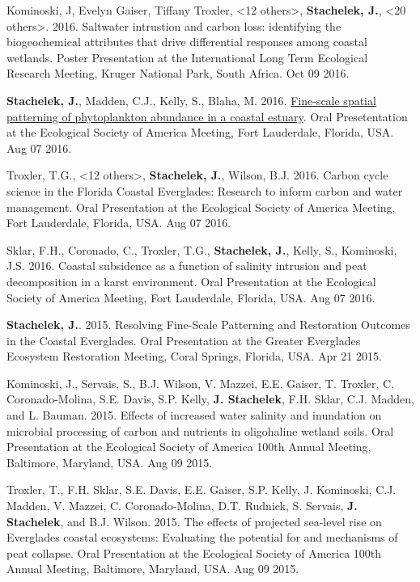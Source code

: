 \documentclass[11pt]{article}
\makeatletter
\newlength{\bibhang}
\newlength{\bibsep}
 {\@listi \global\bibsep\itemsep \global\advance\bibsep by\parsep}
\newenvironment{bibenum*}
  {\renewcommand\labelenumi{[\theenumi]}%
   \etaremune[
     topsep=0pt,
     itemsep=\bibsep,
     parsep=0pt,partopsep=0pt,
     itemindent=-\bibhang,
     leftmargin={\bibhang+\widthof{[999]}}]}
  {\endetaremune}
\makeatother
\begin{document}
\begin{bibenum*}
  \item Kominoski, J, Evelyn Gaiser, Tiffany Troxler, <12 others>, \textbf{Stachelek, J.}, <20 others>. 2016. Saltwater intrustion and carbon loss: identifying the biogeochemical attributes that drive differential responses among coastal wetlands. Poster Presentation at the International Long Term Ecological Research Meeting, Kruger National Park, South Africa. Oct 09 2016.

  \item \textbf{Stachelek, J.}, Madden, C.J., Kelly, S., Blaha, M. 2016. \href{http://doi.org/10.6084/m9.figshare.2775322.v4}{Fine-scale spatial patterning of phytoplankton abundance in a coastal estuary}. Oral Presetentation at the Ecological Society of America Meeting, Fort Lauderdale, Florida, USA. Aug 07 2016. 
  
    \item Troxler, T.G., <12 others>, \textbf{Stachelek, J.}, Wilson, B.J. 2016. Carbon cycle science in the Florida Coastal Everglades: Research to inform carbon and water management. Oral Presentation at the Ecological Society of America Meeting, Fort Lauderdale, Florida, USA. Aug 07 2016.
%   
    \item Sklar, F.H., Coronado, C., Troxler, T.G., \textbf{Stachelek, J.}, Kelly, S., Kominoski, J.S. 2016. Coastal subsidence as a function of salinity intrusion and peat decomposition in a karst environment. Oral Presentation at the Ecological Society of America Meeting, Fort Lauderdale, Florida, USA. Aug 07 2016.
%   
    \item \textbf{Stachelek, J.}. 2015. Resolving Fine-Scale Patterning and Restoration Outcomes in the Coastal Everglades. Oral Presentation at the Greater Everglades Ecosystem Restoration Meeting, Coral Springs, Florida, USA. Apr 21 2015. %
%   
    \item Kominoski, J., Servais, S., B.J. Wilson, V. Mazzei, E.E. Gaiser, T. Troxler, C. Coronado-Molina, S.E. Davis, S.P. Kelly, \textbf{J. Stachelek}, F.H. Sklar, C.J. Madden, and L. Bauman. 2015. Effects of increased water salinity and inundation on microbial processing of carbon and nutrients in oligohaline wetland soils. Oral Presentation at the Ecological Society of America 100th Annual Meeting, Baltimore, Maryland, USA. Aug 09 2015.
%   
    \item Troxler, T., F.H. Sklar, S.E. Davis, E.E. Gaiser, S.P. Kelly, J. Kominoski, C.J. Madden, V. Mazzei, C. Coronado-Molina, D.T. Rudnick, S. Servais, \textbf{J. Stachelek}, and B.J. Wilson. 2015. The effects of projected sea-level rise on Everglades coastal ecosystems: Evaluating the potential for and mechanisms of peat collapse. Oral Presentation at the Ecological Society of America 100th Annual Meeting, Baltimore, Maryland, USA. Aug 09 2015.

\end{bibenum*}
\end{document}
